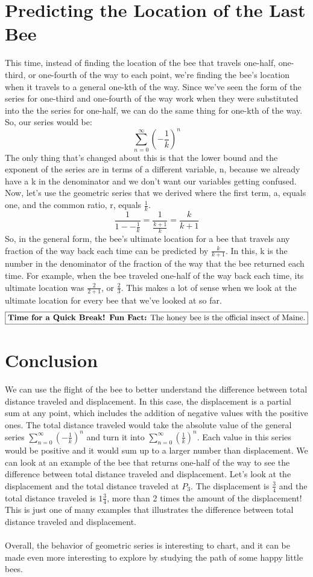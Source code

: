 \documentclass[a4paper,openright, 14pt]{article}
\begin{document}
\section*{Predicting the Location of the Last Bee}
This time, instead of finding the location of the bee that travels one-half, one-third, or one-fourth of the way to each point, we're finding the bee's location when it travels to a general one-kth of the way. Since we've seen the form of the series for one-third and one-fourth of the way work when they were substituted into the the series for one-half, we can do the same thing for one-kth of the way. So, our series would be:
$$\sum\limits_{n=0}^{\infty} (-\frac{1}{k})^n$$
The only thing that's changed about this is that the lower bound and the exponent of the series are in terms of a different variable, n, because we already have a k in the denominator and we don't want our variables getting confused. Now, let's use the geometric series that we derived where the first term, a, equals one, and the common ratio, r, equals $\frac{1}{k}$.
$$\frac{1}{1--\frac{1}{k}}=\frac{1}{\frac{k+1}{k}}=\frac{k}{k+1}$$
So, in the general form, the bee's ultimate location for a bee that travels any fraction of the way back each time can be predicted by $\frac{k}{k+1}$. In this, k is the number in the denominator of the fraction of the way that the bee returned each time. For example, when the bee traveled one-half of the way back each time, its ultimate location was $\frac{2}{2+1}$, or $\frac{2}{3}$. This makes a lot of sense when we look at the ultimate location for every bee that we've looked at so far.
$$\fbox{\textbf{Time for a Quick Break! Fun Fact:} The honey bee is the official insect of Maine.}$$
\section*{Conclusion}
We can use the flight of the bee to better understand the difference between total distance traveled and displacement. In this case, the displacement is a partial sum at any point, which includes the addition of negative values with the positive ones. The total distance traveled would take the absolute value of the general series $\sum\limits_{n=0}^{\infty} (-\frac{1}{k})^n$ and turn it into $\sum\limits_{n=0}^{\infty} (\frac{1}{k})^n$. Each value in this series would be positive and it would sum up to a larger number than displacement. We can look at an example of the bee that returns one-half of the way to see the difference between total distance traveled and displacement. Let's look at the displacement and the total distance traveled at $P_3$. The displacement is $\frac{3}{4}$ and the total distance traveled is $1\frac{3}{4}$, more than 2 times the amount of the displacement! This is just one of many examples that illustrates the difference between total distance traveled and displacement.\\\\
Overall, the behavior of geometric series is interesting to chart, and it can be made even more interesting to explore by studying the path of some happy little bees. 
\end{document}
